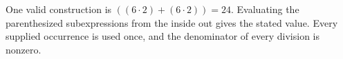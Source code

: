 One valid construction is $\boxed{((6\cdot 2)+(6\cdot 2))=24}$. Evaluating the parenthesized subexpressions from the inside out gives the stated value. Every supplied occurrence is used once, and the denominator of every division is nonzero.

